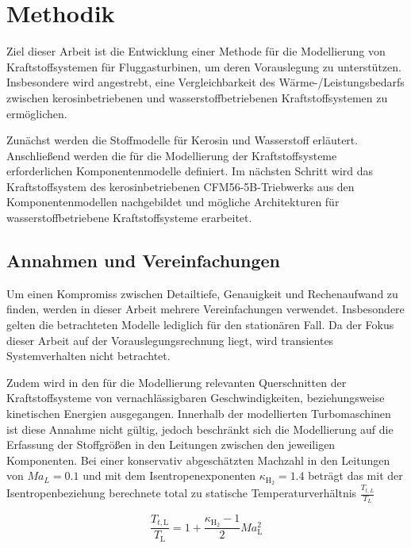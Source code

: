 \chapter{Methodik}
\label{chap:methodik}
Ziel dieser Arbeit ist die Entwicklung einer Methode für die Modellierung von Kraftstoffsystemen für Fluggasturbinen, um deren Vorauslegung zu unterstützen. Insbesondere wird angestrebt, eine Vergleichbarkeit des Wärme-/Leistungsbedarfs zwischen kerosinbetriebenen und wasserstoffbetriebenen Kraftstoffsystemen zu ermöglichen. 

Zunächst werden die Stoffmodelle für Kerosin und Wasserstoff erläutert. Anschließend werden die für die Modellierung der Kraftstoffsysteme erforderlichen Komponentenmodelle definiert. Im nächsten Schritt wird das Kraftstoffsystem des kerosinbetriebenen CFM56-5B-Triebwerks aus den Komponentenmodellen nachgebildet und mögliche Architekturen für wasserstoffbetriebene Kraftstoffsysteme erarbeitet.

\section{Annahmen und Vereinfachungen}

Um einen Kompromiss zwischen Detailtiefe, Genauigkeit und Rechenaufwand zu finden, werden in dieser Arbeit mehrere Vereinfachungen verwendet. Insbesondere gelten die betrachteten Modelle lediglich für den stationären Fall. Da der Fokus dieser Arbeit auf der Vorauslegungsrechnung liegt, wird transientes Systemverhalten nicht betrachtet. 

Zudem wird in den für die Modellierung relevanten Querschnitten der Kraftstoffsysteme von vernachlässigbaren Geschwindigkeiten, beziehungsweise kinetischen Energien ausgegangen. Innerhalb der modellierten Turbomaschinen ist diese Annahme nicht gültig, jedoch beschränkt sich die Modellierung auf die Erfassung der Stoffgrößen in den Leitungen zwischen den jeweiligen Komponenten. Bei einer konservativ abgeschätzten Machzahl in den Leitungen von $Ma_L=0.1$ und mit dem Isentropenexponenten $\kappa_{\mathrm{H}_2} = 1.4$ beträgt das mit der Isentropenbeziehung berechnete total zu statische Temperaturverhältnis  $\frac{T_{t,L}}{T_L}$

\begin{equation}\label{Eq:mach}
	\frac{T_{t,\mathrm{L}}}{T_\mathrm{L}}=1+\frac{\kappa_{\mathrm{H}_2}-1}{2}Ma_\mathrm{L}^2
\end{equation}

